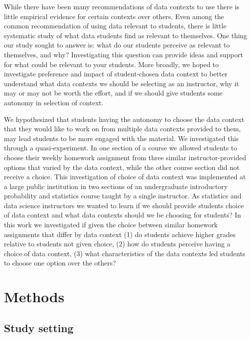 \documentclass[
  12pt]{article}
\begin{document}
While there have been many recommendations of data contexts to use there
is little empirical evidence for certain contexts over others. Even
among the common recommendation of using data relevant to students,
there is little systematic study of what data students find as relevant
to themselves. One thing our study sought to answer is: what do our
students perceive as relevant to themselves, and why? Investigating this
question can provide ideas and support for what could be relevant to
your students. More broadly, we hoped to investigate preference and
impact of student-chosen data context to better understand what data
contexts we should be selecting as an instructor, why it may or may not
be worth the effort, and if we should give students some autonomy in
selection of context.

We hypothesized that students having the autonomy to choose the data
context that they would like to work on from multiple data contexts
provided to them, may lead students to be more engaged with the
material. We investigated this through a quasi-experiment. In one
section of a course we allowed students to choose their weekly homework
assignment from three similar instructor-provided options that varied by
the data context, while the other course section did not receive a
choice. This investigation of choice of data context was implemented at
a large public institution in two sections of an undergraduate
introductory probability and statistics course taught by a single
instructor. As statistics and data science instructors we wanted to
learn if we should provide students choice of data context and what data
contexts should we be choosing for students? In this work we
investigated if given the choice between similar homework assignments
that differ by data context (1) do students achieve higher grades
relative to students not given choice, (2) how do students perceive
having a choice of data context, (3) what characteristics of the data
contexts led students to choose one option over the others?

\section{Methods}\label{sec-methods}

\subsection{Study setting}\label{study-setting}
\end{document}

